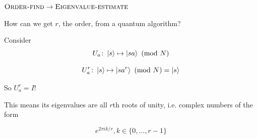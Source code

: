 \documentclass{beamer}
\begin{document}
\begin{frame}{$\textsc{Order-find} \to \textsc{Eigenvalue-estimate}$}

    How can we get $r$, the order, from a quantum algorithm? \pause
    
    Consider $$U_a \colon \ket{s} \mapsto \ket{sa} \ (\text{mod } N)$$ \pause 
    
    $$U_a^r \colon \ket{s} \mapsto \ket{sa^r} \ (\text{mod } N) = \ket{s} $$ \pause
    
    So $U_a^r = I$!
    
    This means its eigenvalues are all $r$th roots of unity, i.e. complex numbers of the form
    
    $$ e^{2 \pi i k/r}, k \in \{0, \ldots, r - 1 \}$$
 
\end{frame}
\end{document}

